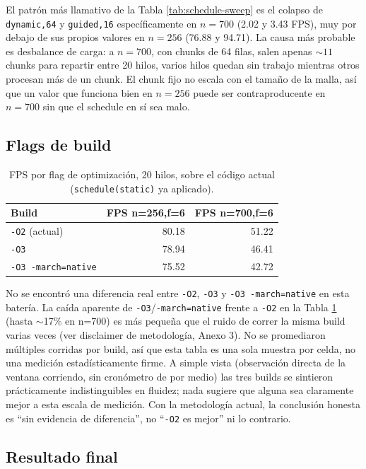 \documentclass[11pt]{article}
\begin{document}
El patrón más llamativo de la Tabla \ref{tab:schedule-sweep} es el
colapso de \texttt{dynamic,64} y \texttt{guided,16} específicamente en
$n=700$ (2.02 y 3.43 FPS), muy por debajo de sus propios valores en
$n=256$ (76.88 y 94.71). La causa más probable es desbalance de carga: a
$n=700$, con chunks de 64 filas, salen apenas $\sim 11$ chunks para
repartir entre 20 hilos, varios hilos quedan sin trabajo mientras otros
procesan más de un chunk. El chunk fijo no escala con el tamaño de la
malla, así que un valor que funciona bien en $n=256$ puede ser
contraproducente en $n=700$ sin que el schedule en sí sea malo.

\subsection{Flags de build}

\begin{table}[ht]
\centering
\begin{tabular}{lrr}
\toprule
Build & FPS n=256,f=6 & FPS n=700,f=6 \\
\midrule
\texttt{-O2} (actual)        & 80.18 & 51.22 \\
\texttt{-O3}                 & 78.94 & 46.41 \\
\texttt{-O3 -march=native}   & 75.52 & 42.72 \\
\bottomrule
\end{tabular}
\caption{FPS por flag de optimización, 20 hilos, sobre el código actual
(\texttt{schedule(static)} ya aplicado).}
\label{tab:o3}
\end{table}

No se encontró una diferencia real entre \texttt{-O2}, \texttt{-O3} y
\texttt{-O3 -march=native} en esta batería. La caída aparente de
\texttt{-O3}/\texttt{-march=native} frente a \texttt{-O2} en la Tabla
\ref{tab:o3} (hasta $\sim$17\% en n=700) es más pequeña que el ruido de
correr la misma build varias veces (ver disclaimer de metodología, Anexo
3). No se promediaron múltiples corridas por build, así que esta tabla
es una sola muestra por celda, no una medición estadísticamente firme. A
simple vista (observación directa de la ventana corriendo, sin cronómetro
de por medio) las tres builds se sintieron prácticamente indistinguibles
en fluidez; nada sugiere que alguna sea claramente mejor a esta escala de
medición. Con la metodología actual, la conclusión honesta es ``sin
evidencia de diferencia'', no ``\texttt{-O2} es mejor'' ni lo contrario.

\subsection{Resultado final}
\end{document}
